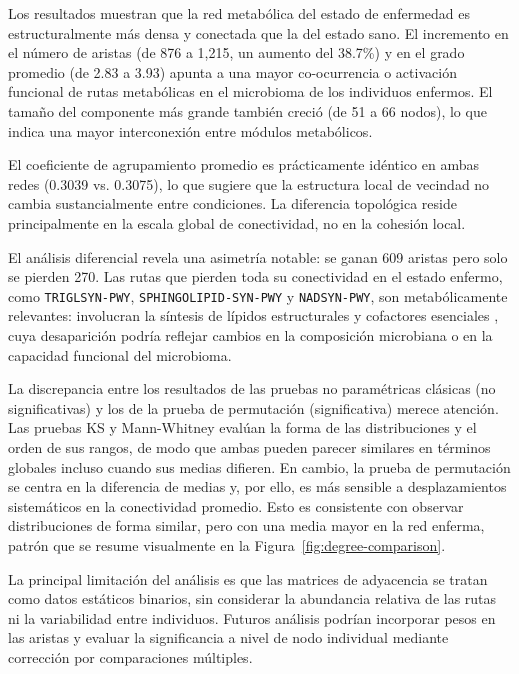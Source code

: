 \documentclass[conference]{IEEEtran}
\begin{document}
Los resultados muestran que la red metabólica del estado de enfermedad es estructuralmente más densa y conectada que la del estado sano. El incremento en el número de aristas (de 876 a 1,215, un aumento del 38.7\%) y en el grado promedio (de 2.83 a 3.93) apunta a una mayor co-ocurrencia o activación funcional de rutas metabólicas en el microbioma de los individuos enfermos. El tamaño del componente más grande también creció (de 51 a 66 nodos), lo que indica una mayor interconexión entre módulos metabólicos.

El coeficiente de agrupamiento promedio es prácticamente idéntico en ambas redes (0.3039 vs. 0.3075), lo que sugiere que la estructura local de vecindad no cambia sustancialmente entre condiciones. La diferencia topológica reside principalmente en la escala global de conectividad, no en la cohesión local.

El análisis diferencial revela una asimetría notable: se ganan 609 aristas pero solo se pierden 270. Las rutas que pierden toda su conectividad en el estado enfermo, como \nolinkurl{TRIGLSYN-PWY}, \nolinkurl{SPHINGOLIPID-SYN-PWY} y \nolinkurl{NADSYN-PWY}, son metabólicamente relevantes: involucran la síntesis de lípidos estructurales y cofactores esenciales \cite{agrawal2024wikipathways,karp2019biocyc}, cuya desaparición podría reflejar cambios en la composición microbiana o en la capacidad funcional del microbioma.

La discrepancia entre los resultados de las pruebas no paramétricas clásicas (no significativas) y los de la prueba de permutación (significativa) merece atención. Las pruebas KS y Mann-Whitney evalúan la forma de las distribuciones y el orden de sus rangos, de modo que ambas pueden parecer similares en términos globales incluso cuando sus medias difieren. En cambio, la prueba de permutación se centra en la diferencia de medias y, por ello, es más sensible a desplazamientos sistemáticos en la conectividad promedio. Esto es consistente con observar distribuciones de forma similar, pero con una media mayor en la red enferma, patrón que se resume visualmente en la Figura~\ref{fig:degree-comparison}.

La principal limitación del análisis es que las matrices de adyacencia se tratan como datos estáticos binarios, sin considerar la abundancia relativa de las rutas ni la variabilidad entre individuos. Futuros análisis podrían incorporar pesos en las aristas y evaluar la significancia a nivel de nodo individual mediante corrección por comparaciones múltiples.
\end{document}
